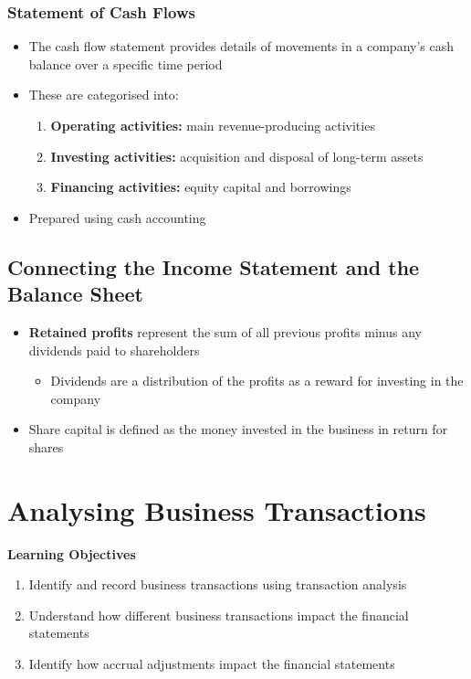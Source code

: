 \documentclass{article}
\begin{document}
		\subsubsection{Statement of Cash Flows}
			\begin{itemize}
				\item The cash flow statement provides details of movements in a company's cash balance over a specific time period
				\item These are categorised into:
					\begin{enumerate}
						\item \textbf{Operating activities:} main revenue-producing activities
						\item \textbf{Investing activities:} acquisition and disposal of long-term assets
						\item \textbf{Financing activities:} equity capital and borrowings
					\end{enumerate}
				\item Prepared using cash accounting
			\end{itemize}

	\subsection{Connecting the Income Statement and the Balance Sheet}
		\begin{itemize}
			\item \textbf{Retained profits} represent the sum of all previous profits minus any dividends paid to shareholders
				\begin{itemize}
					\item Dividends are a distribution of the profits as a reward for investing in the company
				\end{itemize}
			\item Share capital is defined as the money invested in the business in return for shares
		\end{itemize}

\section{Analysing Business Transactions}

	\textbf{Learning Objectives}

		\begin{enumerate}
			\item Identify and record business transactions using transaction analysis
			\item Understand how different business transactions impact the financial statements
			\item Identify how accrual adjustments impact the financial statements
		\end{enumerate}
\end{document}
